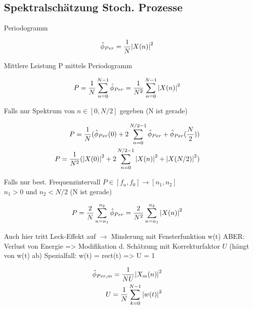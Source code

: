 \documentclass[10pt,a4paper]{article}
\begin{document}
\subsection{Spektralschätzung Stoch. Prozesse}
Periodogramm
  \begin{mdframed}[style=exercise]
    \begin{align}
        \hat{\phi}_{Per} = \frac{1}{N}\abs{X(n)}^2
    \end{align}
  \end{mdframed}
Mittlere Leistung P mittels Periodogramm
  \begin{mdframed}[style=exercise]
    \begin{align}
        P = \frac{1}{N}\sum_{n=0}^{N-1} \hat{\phi}_{Per} = \frac{1}{N^2}\sum_{n=0}^{N-1} \abs{X(n)}^2
    \end{align}
  \end{mdframed}
Falls nur Spektrum von $n\in [0,N/2]$ gegeben (N ist gerade)
  \begin{mdframed}[style=exercise]
    \begin{align}
        P = \frac{1}{N}( \hat{\phi}_{Per}(0) + 2 \sum_{n=0}^{N/2-1} \hat{\phi}_{Per} + \hat{\phi}_{Per}(\frac{N}{2})) \\
        P = \frac{1}{N^2}( \abs{X(0)}^2 + 2 \sum_{n=0}^{N/2-1} \abs{X(n)}^2 + \abs{X(N/2)}^2) 
    \end{align}
  \end{mdframed}
Falls nur best. Frequenzintervall $P\in [f_u,f_0] \rightarrow [n_1,n_2]$\\ 
$n_{1} > 0$ und $n_{2} < N/2$ (N ist gerade)
  \begin{mdframed}[style=exercise]
    \begin{align}
        P = \frac{2}{N}\sum_{n=n_1}^{n_2} \hat{\phi}_{Per} = \frac{2}{N^2}\sum_{n=n_1}^{n_2} \abs{X(n)}^2
    \end{align}
  \end{mdframed}
Auch hier tritt Leck-Effekt auf $\rightarrow$ Minderung mit Fensterfunktion w(t) 
ABER: Verlust von Energie => Modifikation d. Schätzung mit Korrekturfaktor $U$ (hängt von w(t) ab)
Spezialfall: w(t) = rect(t) => U = 1 
  \begin{mdframed}[style=exercise]
    \begin{align}
        \hat{\phi}_{Per,m} = \frac{1}{NU}\abs{X_m(n)}^2\\
        U = \frac{1}{N}\sum_{k=0}^{N-1} \abs{w(t)}^2 
    \end{align}
  \end{mdframed}
\end{document}
